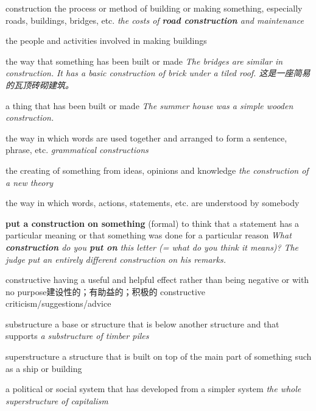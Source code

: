 \begin{DefWord}{construction}
    the process or method of building or making something, especially roads, buildings, bridges, etc.
    \textit{the costs of \textbf{road construction} and maintenance}

    the people and activities involved in making buildings

    the way that something has been built or made
    \textit{The bridges are similar in construction.}
    \textit{It has a basic construction of brick under a tiled roof. 这是一座简易的瓦顶砖砌建筑。}

    a thing that has been built or made
    \textit{The summer house was a simple wooden construction.}

    the way in which words are used together and arranged to form a sentence, phrase, etc.
    \textit{grammatical constructions}

    the creating of something from ideas, opinions and knowledge
    \textit{the construction of a new theory}

    the way in which words, actions, statements, etc. are understood by somebody

    \textbf{put a construction on something} (formal) to think that a statement has a particular meaning or that something was done for a particular reason
    \textit{What \textbf{construction} do you \textbf{put on} this letter (= what do you think it means)?}
    \textit{The judge put an entirely different construction on his remarks.}
\end{DefWord}

\begin{DefWord}{constructive}
    having a useful and helpful effect rather than being negative or with no purpose建设性的；有助益的；积极的
constructive criticism/suggestions/advice
\end{DefWord}

\begin{DefWord}{substructure}
    a base or structure that is below another structure and that supports 
    \textit{a substructure of timber piles}
    
\end{DefWord}

\begin{DefWord}{superstructure}
    a structure that is built on top of the main part of something such as a ship or building

    a political or social system that has developed from a simpler system
    \textit{the whole superstructure of capitalism}

\end{DefWord}


